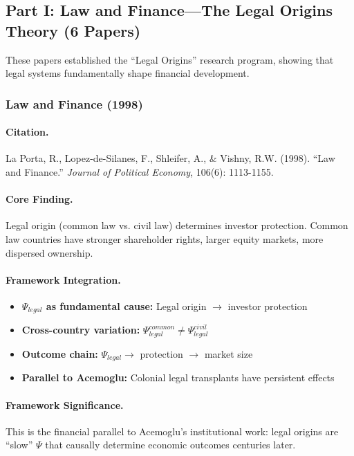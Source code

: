 \subsection{Part I: Law and Finance---The Legal Origins Theory (6 Papers)}

These papers established the ``Legal Origins'' research program, showing that
legal systems fundamentally shape financial development.

\subsubsection{Law and Finance (1998)}

\paragraph{Citation.}
La Porta, R., Lopez-de-Silanes, F., Shleifer, A., \& Vishny, R.W. (1998).
``Law and Finance.'' \emph{Journal of Political Economy}, 106(6): 1113-1155.

\paragraph{Core Finding.}
Legal origin (common law vs. civil law) determines investor protection.
Common law countries have stronger shareholder rights, larger equity markets,
more dispersed ownership.

\paragraph{Framework Integration.}
\begin{itemize}
  \item \textbf{$\Psi_{legal}$ as fundamental cause:} Legal origin $\to$ investor protection
  \item \textbf{Cross-country variation:} $\Psi_{legal}^{common} \neq \Psi_{legal}^{civil}$
  \item \textbf{Outcome chain:} $\Psi_{legal} \to$ protection $\to$ market size
  \item \textbf{Parallel to Acemoglu:} Colonial legal transplants have persistent effects
\end{itemize}

\paragraph{Framework Significance.}
This is the financial parallel to Acemoglu's institutional work: legal origins
are ``slow'' $\Psi$ that causally determine economic outcomes centuries later.

